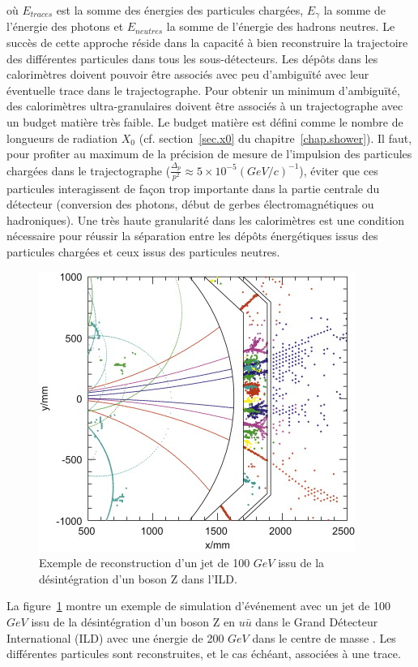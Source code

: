où $E_{traces}$ est la somme des énergies des particules chargées, $E_{\gamma}$ la somme de l'énergie des photons et $E_{neutres}$ la somme de l'énergie des hadrons neutres. Le succès de cette approche réside dans la capacité à bien reconstruire la trajectoire des différentes particules dans tous les sous-détecteurs. Les dépôts dans les calorimètres doivent pouvoir être associés avec peu d'ambiguïté avec leur éventuelle trace dans le trajectographe. Pour obtenir un minimum d’ambiguïté, des calorimètres ultra-granulaires doivent être associés à un trajectographe avec un budget matière très faible. Le budget matière est défini comme le nombre de longueurs de radiation $X_0$ (cf. section~\ref{sec.x0} du chapitre~\ref{chap.shower}). Il faut, pour profiter au maximum de la précision de mesure de l'impulsion des particules chargées dans le trajectographe ($\frac{\Delta_p}{p^2}\approx 5\times10^{-5} (GeV/c)^{-1}$), éviter que ces particules interagissent de façon trop importante dans la partie centrale du détecteur (conversion des photons, début de gerbes électromagnétiques ou hadroniques). Une très haute granularité dans les calorimètres est une condition nécessaire pour réussir la séparation entre les dépôts énergétiques issus des particules chargées et ceux issus des particules neutres. 

\begin{figure}[!ht]
  \begin{center}
    \includegraphics[width=.6\textwidth]{ILC/figs/pfa_ild.jpg}
    \caption{Exemple de reconstruction d'un jet de 100 $GeV$ issu de la désintégration d'un boson Z dans l'ILD.}
    \label{fig:pfa-example}
  \end{center}
\end{figure}
La figure~\ref{fig:pfa-example} montre un exemple de simulation d'événement avec un jet de 100 $GeV$ issu de la désintégration d'un boson Z en $u\bar u$ dans le Grand Détecteur International (ILD) avec une énergie de 200 $GeV$ dans le centre de masse \cite{pfaPandora}. Les différentes particules sont reconstruites, et le cas échéant, associées à une trace. 

